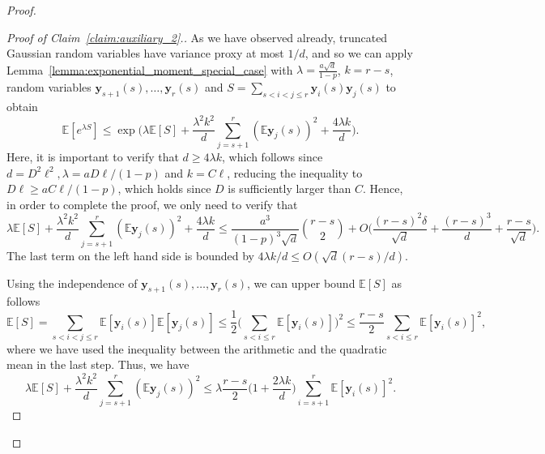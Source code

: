 \documentclass[11pt]{amsart}
\theoremstyle{definition}
\def\bE{\mathbb{E}}
\def\by{\boldsymbol{y}}
\begin{document}
\begin{proof}
\begin{proof}[Proof of Claim~\ref{claim:auxiliary_2}.]
As we have observed already, truncated Gaussian random variables have variance proxy at most $1/d$, and so we can apply Lemma~\ref{lemma:exponential_moment_special_case} with $\lambda=\frac{a\sqrt{d}}{1-p}$, $k=r-s$, random variables $\by_{s+1}(s), \dots, \by_{r}(s)$ and $S=\sum_{s<i<j\leq r}\by_i(s)\by_j(s)$ to obtain
{\smaller[0.3]
\[\bE[e^{\lambda S}]\leq \exp\bigg( \lambda \bE[S] \!+\! \frac{\lambda^2k^2}{d}\sum_{j=s+1}^r (\bE \by_j(s))^2 \!+\!\frac{4\lambda k}{d}\bigg).\]
}
Here, it is important to verify that $d\geq 4\lambda k$, which follows since $d=D^2\ell^2, \lambda=aD\ell/(1-p)$ and $k=C\ell$, reducing the inequality to $D\ell\geq aC\ell/(1-p)$, which holds since $D$ is sufficiently larger than $C$. Hence, in order to complete the proof, we only need to verify that
{\smaller[0.3]
\[\lambda \bE[S] \!+\! \frac{\lambda^2k^2}{d}\sum_{j=s+1}^r (\bE \by_j(s))^2 \!+\!\frac{4\lambda k}{d}\leq \frac{a^3}{(1\!-\!p)^3\sqrt{d}}\binom{r\!-\!s}{2}\!+\!O\Big(\frac{(r\!-\!s)^2\delta}{\sqrt{d}}\!+\!\frac{(r\!-\!s)^3}{d}\!+\!\frac{r-s}{\sqrt{d}}\Big).\]
}
The last term on the left hand side is bounded by $4\lambda k/d\leq O(\sqrt{d}(r-s)/d)$.

Using the independence of $\by_{s+1}(s), \dots, \by_r(s)$, we can upper bound $\bE[S]$ as follows
{\smaller[0.3]
\[\bE[S]=\sum_{s<i<j\leq r}\bE[\by_i(s)]\bE[\by_j(s)]\leq \frac{1}{2}\Big(\sum_{s<i\leq r}\bE[\by_i(s)]\Big)^2\leq \frac{r\!-\!s}{2}\sum_{s<i\leq r}\bE[\by_i(s)]^2,\]
}
where we have used the inequality between the arithmetic and the quadratic mean in the last step. Thus, we have
{\smaller[0.3]
\[\lambda \bE[S] \!+\! \frac{\lambda^2k^2}{d}\sum_{j=s+1}^r (\bE \by_j(s))^2\leq \lambda \frac{r\!-\!s}{2}\Big(1\!+\!\frac{2\lambda k}{d}\Big)\sum_{i=s+1}^r \bE[\by_i(s)]^2.\]
}


\end{proof}
\end{proof}
\end{document}
